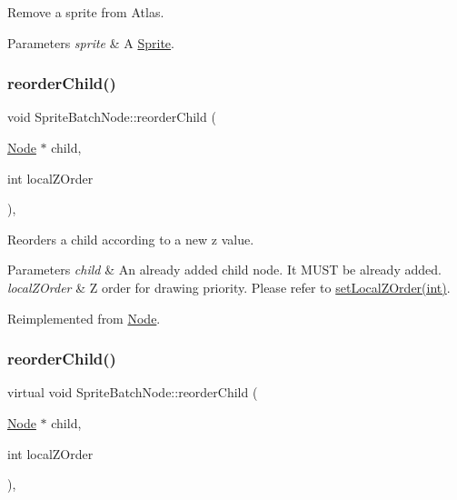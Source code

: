Remove a sprite from Atlas.


\begin{DoxyParams}{Parameters}
{\em sprite} & A \hyperlink{classSprite}{Sprite}. \\
\hline
\end{DoxyParams}
\mbox{\label{classSpriteBatchNode_a9f4e7d0be49a3c044424624ea283c301}} 
\subsubsection{\texorpdfstring{reorder\+Child()}{reorderChild()}\hspace{0.1cm}{\footnotesize\ttfamily [1/2]}}
{\footnotesize\ttfamily void Sprite\+Batch\+Node\+::reorder\+Child (\begin{DoxyParamCaption}\item[{\hyperlink{classNode}{Node} $\ast$}]{child,  }\item[{int}]{local\+Z\+Order }\end{DoxyParamCaption})\hspace{0.3cm}{\ttfamily [override]}, {\ttfamily [virtual]}}

Reorders a child according to a new z value.


\begin{DoxyParams}{Parameters}
{\em child} & An already added child node. It M\+U\+ST be already added. \\
\hline
{\em local\+Z\+Order} & Z order for drawing priority. Please refer to \hyperlink{classNode_aee4e616c2d55b722226aae1e68b4946f}{set\+Local\+Z\+Order(int)}. \\
\hline
\end{DoxyParams}


Reimplemented from \hyperlink{classNode_a5c9bc72e7f53c1e7f0ef6bc87c07a08f}{Node}.

\mbox{\label{classSpriteBatchNode_a8125810f4a9d5e1c4a4c82cd906baafd}} 
\subsubsection{\texorpdfstring{reorder\+Child()}{reorderChild()}\hspace{0.1cm}{\footnotesize\ttfamily [2/2]}}
{\footnotesize\ttfamily virtual void Sprite\+Batch\+Node\+::reorder\+Child (\begin{DoxyParamCaption}\item[{\hyperlink{classNode}{Node} $\ast$}]{child,  }\item[{int}]{local\+Z\+Order }\end{DoxyParamCaption})\hspace{0.3cm}{\ttfamily [override]}, {\ttfamily [virtual]}}

